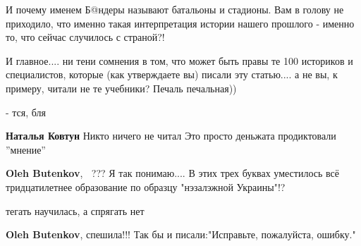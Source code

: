 \begin{itemize}
И почему именем Б@ндеры называют батальоны и стадионы. Вам в голову не
приходило, что именно такая интерпретация истории нашего прошлого - именно то,
что сейчас случилось с страной?! 

И главное.... ни тени сомнения в том, что может быть правы те 100 историков и
специалистов, которые (как утверждаете вы) писали эту статью.... а не вы, к
примеру, читали не те учебники? Печаль печальная))

\begin{itemize}
 
- тся, бля

 
\textbf{Наталья Ковтун}
Никто ничего не читал
Это просто деньжата продиктовали ''мнение''

 
\textbf{Oleh Butenkov}, 🤫🤔??? Я так понимаю.... В этих трех буквах уместилось
всё тридцатилетнее образование по образцу "нэзалэжной Украины"!?

 
тегать научилась, а спрягать нет

 
\textbf{Oleh Butenkov}, спешила!!! Так бы и писали:"Исправьте, пожалуйста, ошибку."

 

\end{itemize}
\end{itemize}
